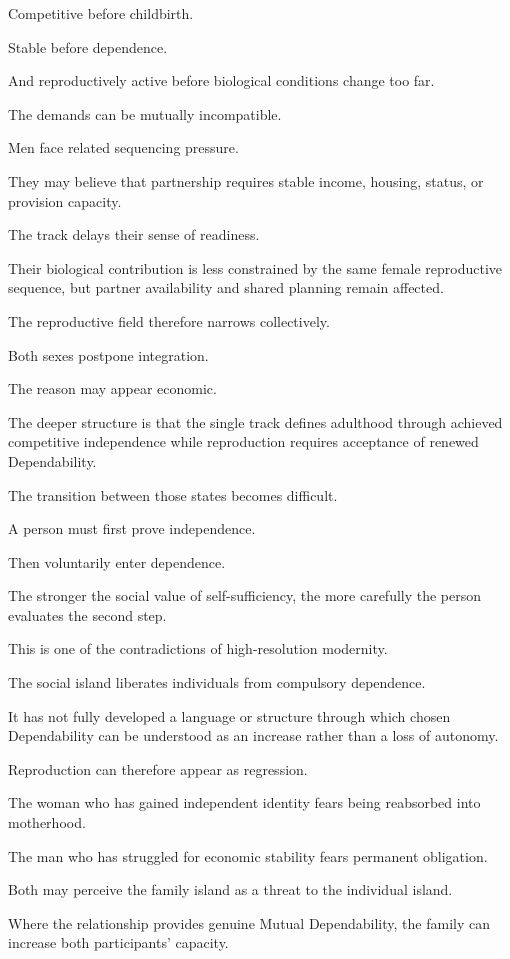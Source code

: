 Competitive before childbirth.

Stable before dependence.

And reproductively active before biological conditions change too far.

The demands can be mutually incompatible.

Men face related sequencing pressure.

They may believe that partnership requires stable income, housing, status, or provision capacity.

The track delays their sense of readiness.

Their biological contribution is less constrained by the same female reproductive sequence, but partner availability and shared planning remain affected.

The reproductive field therefore narrows collectively.

Both sexes postpone integration.

The reason may appear economic.

The deeper structure is that the single track defines adulthood through achieved competitive independence while reproduction requires acceptance of renewed Dependability.

The transition between those states becomes difficult.

A person must first prove independence.

Then voluntarily enter dependence.

The stronger the social value of self-sufficiency, the more carefully the person evaluates the second step.

This is one of the contradictions of high-resolution modernity.

The social island liberates individuals from compulsory dependence.

It has not fully developed a language or structure through which chosen Dependability can be understood as an increase rather than a loss of autonomy.

Reproduction can therefore appear as regression.

The woman who has gained independent identity fears being reabsorbed into motherhood.

The man who has struggled for economic stability fears permanent obligation.

Both may perceive the family island as a threat to the individual island.

Where the relationship provides genuine Mutual Dependability, the family can increase both participants’ capacity.


